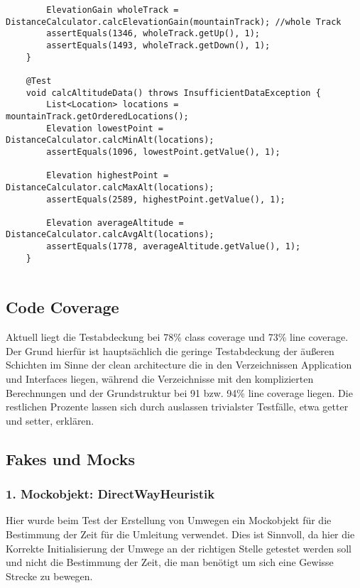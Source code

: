 \begin{lstlisting}
        ElevationGain wholeTrack = DistanceCalculator.calcElevationGain(mountainTrack); //whole Track
        assertEquals(1346, wholeTrack.getUp(), 1);
        assertEquals(1493, wholeTrack.getDown(), 1);
    }

    @Test
    void calcAltitudeData() throws InsufficientDataException {
        List<Location> locations = mountainTrack.getOrderedLocations();
        Elevation lowestPoint = DistanceCalculator.calcMinAlt(locations);
        assertEquals(1096, lowestPoint.getValue(), 1);

        Elevation highestPoint = DistanceCalculator.calcMaxAlt(locations);
        assertEquals(2589, highestPoint.getValue(), 1);

        Elevation averageAltitude = DistanceCalculator.calcAvgAlt(locations);
        assertEquals(1778, averageAltitude.getValue(), 1);
    }
    
\end{lstlisting}

\subsection{Code Coverage}
Aktuell liegt die Testabdeckung bei 78\% class coverage und 73\% line coverage. Der Grund hierfür ist hauptsächlich die geringe Testabdeckung der äußeren Schichten im Sinne der clean architecture die in den Verzeichnissen Application und Interfaces liegen, während die Verzeichnisse mit den komplizierten Berechnungen und der Grundstruktur bei 91 bzw. 94\% line coverage liegen. Die restlichen Prozente lassen sich durch auslassen trivialster Testfälle, etwa getter und setter, erklären.

\subsection{Fakes und Mocks}
 
 \subsubsection{1. Mockobjekt: DirectWayHeuristik}
 
 Hier wurde beim Test der Erstellung von Umwegen ein Mockobjekt für die Bestimmung der Zeit für die Umleitung verwendet. Dies ist Sinnvoll, da hier die Korrekte Initialisierung der Umwege an der richtigen Stelle getestet werden soll und nicht die Bestimmung der Zeit, die man benötigt um sich eine Gewisse Strecke zu bewegen.
 

